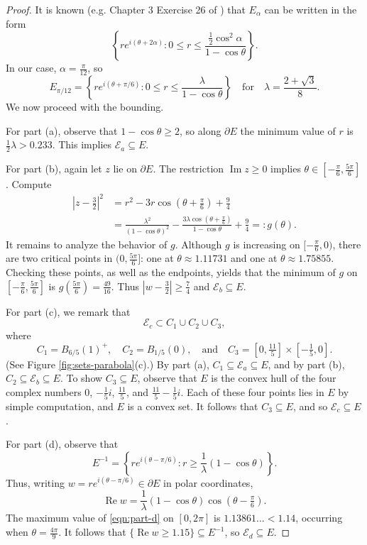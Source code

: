 \documentclass[11pt]{article}
\theoremstyle{definition}
\renewcommand{\Re}{\operatorname{Re}}
\renewcommand{\Im}{\operatorname{Im}}
\newcommand{\lm}{\lambda}
\newcommand{\ball}[2]{B_{#2}(#1)}
\newcommand{\calE}{\mathcal E}
\newcommand{\abs}[1]{\left|#1\right|}
\begin{document}
\begin{proof}
	It is known (e.g. Chapter 3 Exercise 26 of \cite{Lorentzen2008}) that $E_\alpha$ can be written in the form
	\[
	\left\{
	r e^{i(\theta + 2\alpha)}: 0\leq r\leq \frac{\frac12\cos^2\alpha}{1-\cos\theta}
	\right\}.
	\]
	In our case, $\alpha = \tfrac\pi{12}$, so
	\[
	E_{\pi/12} = \left\{r e^{i(\theta + \pi/6)}:0\leq r\leq \frac\lm{1-\cos\theta}\right\}\quad\text{for}\quad \lm = \frac{2+\sqrt 3}8.
	\]
	We now proceed with the bounding.  
	
	\par For part (a), observe that $1-\cos\theta \geq 2$, so along $\partial E$ the minimum value of $r$ is $\tfrac12\lm > 0.233$.  This implies $\calE_a\subseteq E$.
	
	For part (b), again let $z$ lie on $\partial E$.  The restriction $\Im z \geq 0$ implies $\theta\in[-\tfrac\pi 6, \tfrac{5\pi}6]$.  Compute
	\begin{align*}
		\abs{z-\tfrac32}^2 &= r^2 - 3r\cos\left(\theta + \frac\pi 6\right) + \frac 94\\
		&= \frac{\lm^2}{(1-\cos\theta)^2} - \frac{3\lm \cos(\theta + \frac\pi 6)}{1-\cos\theta} + \frac 94 =: g(\theta).
	\end{align*}
	It remains to analyze the behavior of $g$.  Although $g$ is increasing on $[-\tfrac\pi 6,0)$, there are two critical points in $(0,\tfrac{5\pi}6]$: one at $\theta\approx 1.11731$ and one at $\theta\approx 1.75855$.  Checking these points, as well as the endpoints, yields that the minimum of $g$ on $[-\tfrac\pi 6, \tfrac{5\pi}6]$ is $g(\tfrac{5\pi}6) = \tfrac{49}{16}$.  Thus $|w-\tfrac32| \geq \tfrac{7}{4}$ and $\calE_b\subseteq E$.
	
	For part (c), we remark that
	\[
	\calE_c \subset C_1\cup C_2\cup C_3,
	\]
	where 
	\[
	C_1 = \ball{1}{6/5}^+,\quad C_2 = \ball{0}{1/5},\quad\text{and}\quad C_3 = [0,\tfrac{11}5]\times[-\tfrac15,0].
	\]
	(See Figure \ref{fig:sets-parabola}(c).)  By part (a), $C_1\subseteq \calE_a\subseteq E$, and by part (b), $C_2\subseteq \calE_b\subseteq E$.  To show $C_3\subseteq E$, observe that $E$ is the convex hull of the four complex numbers $0$, $-\tfrac 15i$, $\tfrac {11}5$, and $\tfrac{11}5 - \tfrac 15i$.  Each of these four points lies in $E$ by simple computation, and $E$ is a convex set.  It follows that $C_3\subseteq E$, and so $\calE_c\subseteq E$.
	
	For part (d), observe that 
	\[
	E^{-1} = \left\{r e^{i(\theta - \pi/6)}:r\geq \frac 1\lm(1-\cos\theta)\right\}.
	\]
	Thus, writing $w = re^{i(\theta - \pi/6)} \in\partial E$ in polar coordinates,
	\begin{equation}\label{eqn:part-d}
	\Re w = \frac 1\lm (1-\cos\theta)\cos(\theta - \tfrac\pi 6).
	\end{equation}
	The maximum value of \eqref{eqn:part-d} on $[0, 2\pi]$ is $1.13861\ldots < 1.14$, occurring when $\theta = \tfrac{4\pi}9$.
	It follows that $\{\Re w \geq 1.15\}\subseteq E^{-1}$, so $\calE_d\subseteq E$.
	

\end{proof}
\end{document}
